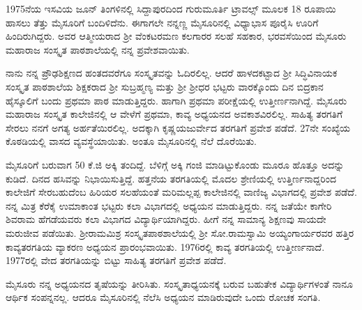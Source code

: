 {1975ನೆಯ ಇಸವಿಯ ಜೂನ್ ತಿಂಗಳಿನಲ್ಲಿ ಸಿದ್ದಾಪುರದಿಂದ ಗುರುಮೂರ್ತಿ ಟ್ರಾವಲ್ಸ್ ಮೂಲಕ 18 ರೂಪಾಯಿ ಹಾಸಲು ತೆತ್ತು ಮೈಸೂರಿಗೆ ಬಂದಿಳಿದೆನು. ಈಗಾಗಲೇ ನನ್ನಣ್ಣ ಮೈಸೂರಿನಲ್ಲಿ ವಿಧ್ಯಾಭಾಸ ಪೂರೈಸಿ ಊರಿಗೆ ಹಿಂದಿರುಗಿದ್ದರು.  ಅವರ ಆತ್ಮೀಯರಾದ ಶ್ರೀ ವೆಂಕಟರಮಣ ಕಲಗಾರರ ಸಲಹೆ ಸಹಕಾರ, ಭರವಸೆಯಿಂದ ಮೈಸೂರು ಮಹಾರಾಜ ಸಂಸ್ಕೃತ ಪಾಠಶಾಲೆಯಲ್ಲಿ ನನ್ನ ಪ್ರವೇಶವಾಯಿತು.

ನಾನು ನನ್ನ ಪ್ರೌಢಶಿಕ್ಷಣದ ಹಂತದವರೆಗೂ ಸಂಸ್ಕೃತವನ್ನು ಓದಿರಲಿಲ್ಲ.   ಆದರೆ ಹಾಳದಕಟ್ಟಾದ ಶ್ರೀ ಸಿದ್ಧಿವಿನಾಯಕ ಸಂಸ್ಕೃತ ಪಾಠಶಾಲೆಯ ಶಿಕ್ಷಕರಾದ ಶ್ರೀ ಸುಬ್ರಹ್ಮಣ್ಯ ಮತ್ತು ಶ್ರೀ ಶ್ರೀಧರ ಭಟ್ಟರು ವಾರಕ್ಕೊಂದು ದಿನ ಬಿದ್ರಕಾನ ಹೈಸ್ಕೂಲಿಗೆ ಬಂದು ಪ್ರಥಮಾ ಪಾಠ ಮಾಡುತ್ತಿದ್ದರು.  ಹಾಗಾಗಿ ಪ್ರಥಮಾ ಪರೀಕ್ಷೆಯಲ್ಲಿ ಉತ್ತೀರ್ಣನಾಗಿದ್ದೆ.  ಮೈಸೂರು ಮಹಾರಾಜ ಸಂಸ್ಕೃತ ಕಾಲೇಜಿನಲ್ಲಿ ಆ ವೇಳೆಗೆ ಪ್ರಥಮಾ, ಕಾವ್ಯ ಅಧ್ಯಯನದ ಅವಕಾಶವಿರಲಿಲ್ಲ.  ಸಾಹಿತ್ಯ ತರಗತಿಗೆ ಸೇರಲು ನನಗೆ ಅಗತ್ಯ ಅರ್ಹತೆಯಿರಲಿಲ್ಲ.  ಅದಕ್ಕಾಗಿ ಕೃಷ್ಣಯಜುರ್ವೇದ  ತರಗತಿಗೆ ಪ್ರವೇಶ ಪಡೆದೆ.  27ನೇ ಸಂಖ್ಯೆಯ ಕೊಠಡಿಯಲ್ಲಿ ವಾಸದ ವ್ಯವಸ್ಥೆಯಾಯಿತು. ಅಂತೂ ಮೈಸೂರಿನಲ್ಲಿ ನೆಲೆ ದೊರೆಯಿತು.

ಮೈಸೂರಿಗೆ ಬರುವಾಗ 50 ಕೆ.ಜಿ ಅಕ್ಕಿ ತಂದಿದ್ದೆ.  ಬೆಳಿಗ್ಗೆ ಅಕ್ಕಿ ಗಂಜಿ ಮಾಡಿಟ್ಟುಕೊಂಡು ಮೂರೂ ಹೊತ್ತೂ ಅದನ್ನು ಕುಡಿದೆ. ದಿನದ ಹಸಿವನ್ನು ನಿಭಾಯಿಸುತ್ತಿದ್ದೆ. ಹತ್ತನೆಯ ತರಗತಿಯಲ್ಲಿ ಮೊದಲ ಶ್ರೇಣಿಯಲ್ಲಿ ಉತ್ತಿರ್ಣನಾದ್ದರಿಂದ ಕಾಲೇಜಿಗೆ ಸೇರ\-ಬಹುದೆಂಬ ಹಿರಿಯರ ಸಲಹೆಯಂತೆ ಮರಿಮಲ್ಲಪ್ಪ ಕಾಲೇಜಿನಲ್ಲಿ ವಾಣಿಜ್ಯ ವಿಭಾಗದಲ್ಲಿ ಪ್ರವೇಶ ಪಡೆದೆ.  ನನ್ನ ಮಿತ್ರ ಕೆರೆಕೈ ಉಮಾಕಾಂತ ಭಟ್ಟರು ಕಲಾ ವಿಭಾಗದಲ್ಲಿ \hbox{ಅಧ್ಯಯನ} ಮಾಡುತ್ತಿದ್ದರು.  ನನ್ನ ಜತೆಯೇ ಕಾಗೇರಿ ಶಿವರಾಮ ಹೆಗಡೆಯವರು ಕಲಾ \hbox{ವಿಭಾಗದ} ವಿದ್ಯಾರ್ಥಿಯಾಗಿದ್ದರು.  ಹೀಗೆ ನನ್ನ ಸಾಮಾನ್ಯ ಶಿಕ್ಷಣವು ಸಾಯದೇ ಮರುಜೀವ ಪಡೆಯಿತು.  ಶ್ರೀರಾಮಮಿಶ್ರ ಸಂಸ್ಕೃತಪಾಠಶಾಲೆಯಲ್ಲಿ     ಶ್ರೀ ಸೋ.ರಾಮಸ್ವಾಮಿ \-ಅಯ್ಯಂಗಾರ್ಯರವರ ಹತ್ತಿರ ಕಾವ್ಯತರಗತಿಯ ವ್ಯಾಕರಣ ಅಧ್ಯಯನ ಪ್ರಾರಂಭ\-ವಾಯಿತು. 1976ರಲ್ಲಿ ಕಾವ್ಯ ತರಗತಿಯಲ್ಲಿ ಉತ್ತೀರ್ಣನಾದೆ. 1977ರಲ್ಲಿ ವೇದ ತರಗತಿ\-ಯನ್ನು ಬಿಟ್ಟು ಸಾಹಿತ್ಯ ತರಗತಿಗೆ ಪ್ರವೇಶ ಪಡೆದೆ.

ಮೈಸೂರು ನನ್ನ ಅಧ್ಯಯನದ ತೃಷೆಯನ್ನು ತೀರಿಸಿತು.  ಸಂಸ್ಕೃತಾಧ್ಯಯನಕ್ಕೆ ಬರುವ ಬಹುತೇಕ ವಿದ್ಯಾರ್ಥಿಗಳಂತೆ ನಾನೂ ಆರ್ಥಿಕ ಸಂಪನ್ನನಲ್ಲ.  ಆದರೂ \hbox{ಮೈಸೂರಿನಲ್ಲಿ} ನೆಲೆಸಿ ಅಧ್ಯಯನ ಮಾಡಿರುವುದೇ ಒಂದು ರೋಚಕ ಸಂಗತಿ. 

}

